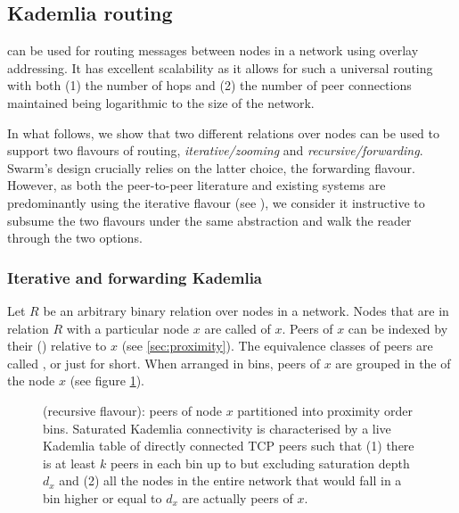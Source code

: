 \subsection{Kademlia routing}\label{sec:kademlia-routing}

 can be used for routing messages between nodes in a network using overlay addressing. It has excellent scalability as it allows for such a universal routing with both (1) the number of hops and (2) the number of peer connections maintained being logarithmic to the size of the network. 

In what follows, we show that two different relations over nodes can be used to support two flavours of routing, \emph{iterative/zooming} and \emph{recursive/forwarding}. Swarm's design crucially relies on the latter choice, the forwarding flavour. However, as both the peer-to-peer literature and existing systems are predominantly using the iterative flavour (see \cite{maymounkov2002kademlia,baumgart2007s,lua2005survey}), we consider it instructive to subsume the two flavours under the same abstraction and walk the reader through the two options.

\subsubsection{Iterative and forwarding Kademlia}

Let $R$ be an arbitrary binary relation over nodes in a network. Nodes that are in relation $R$ with a particular node $x$ are called  of $x$. Peers of $x$ can be indexed by their  () relative to $x$ (see \ref{sec:proximity}).
The equivalence classes of peers are called , or just  for short. When arranged in bins, peers of $x$ are grouped in the  of the node $x$ (see figure \ref{fig:kademlia-table}). 



\begin{figure}[htbp]
   \centering
    
    
   \caption[Kademlia table (recursive flavour)]{ (recursive flavour):  peers of node $x$ partitioned into proximity order bins. Saturated Kademlia connectivity is 
   characterised by a live Kademlia table of directly connected TCP peers such that (1) there is at least $k$ peers in each bin up to but excluding saturation depth $d_x$ and (2) all the nodes in the entire network that would fall in a bin higher or equal to $d_x$ are actually peers of $x$. }
   \label{fig:kademlia-table}
\end{figure}

